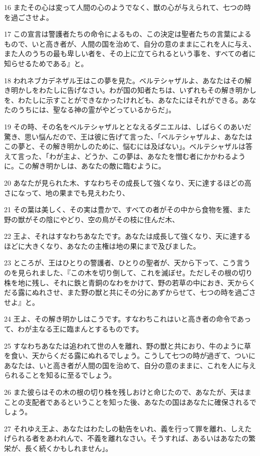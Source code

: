 \par 16 またその心は変って人間の心のようでなく、獣の心が与えられて、七つの時を過ごさせよ。
\par 17 この宣言は警護者たちの命令によるもの、この決定は聖者たちの言葉によるもので、いと高き者が、人間の国を治めて、自分の意のままにこれを人に与え、また人のうちの最も卑しい者を、その上に立てられるという事を、すべての者に知らせるためである』と。
\par 18 われネブカデネザル王はこの夢を見た。ベルテシャザルよ、あなたはその解き明かしをわたしに告げなさい。わが国の知者たちは、いずれもその解き明かしを、わたしに示すことができなかったけれども、あなたにはそれができる。あなたのうちには、聖なる神の霊がやどっているからだ」。
\par 19 その時、その名をベルテシャザルととなえるダニエルは、しばらくのあいだ驚き、思い悩んだので、王は彼に告げて言った、「ベルテシャザルよ、あなたはこの夢と、その解き明かしのために、悩むには及ばない」。ベルテシャザルは答えて言った、「わが主よ、どうか、この夢は、あなたを憎む者にかかわるように。この解き明かしは、あなたの敵に臨むように。
\par 20 あなたが見られた木、すなわちその成長して強くなり、天に達するほどの高さになって、地の果までも見えわたり、
\par 21 その葉は美しく、その実は豊かで、すべての者がその中から食物を獲、また野の獣がその陰にやどり、空の鳥がその枝に住んだ木、
\par 22 王よ、それはすなわちあなたです。あなたは成長して強くなり、天に達するほどに大きくなり、あなたの主権は地の果にまで及びました。
\par 23 ところが、王はひとりの警護者、ひとりの聖者が、天から下って、こう言うのを見られました、『この木を切り倒して、これを滅ぼせ。ただしその根の切り株を地に残し、それに鉄と青銅のなわをかけて、野の若草の中におき、天からくだる露にぬれさせ、また野の獣と共にその分にあずからせて、七つの時を過ごさせよ』と。
\par 24 王よ、その解き明かしはこうです。すなわちこれはいと高き者の命令であって、わが主なる王に臨まんとするものです。
\par 25 すなわちあなたは追われて世の人を離れ、野の獣と共におり、牛のように草を食い、天からくだる露にぬれるでしょう。こうして七つの時が過ぎて、ついにあなたは、いと高き者が人間の国を治めて、自分の意のままに、これを人に与えられることを知るに至るでしょう。
\par 26 また彼らはその木の根の切り株を残しおけと命じたので、あなたが、天はまことの支配者であるということを知った後、あなたの国はあなたに確保されるでしょう。
\par 27 それゆえ王よ、あなたはわたしの勧告をいれ、義を行って罪を離れ、しえたげられる者をあわれんで、不義を離れなさい。そうすれば、あるいはあなたの繁栄が、長く続くかもしれません」。

